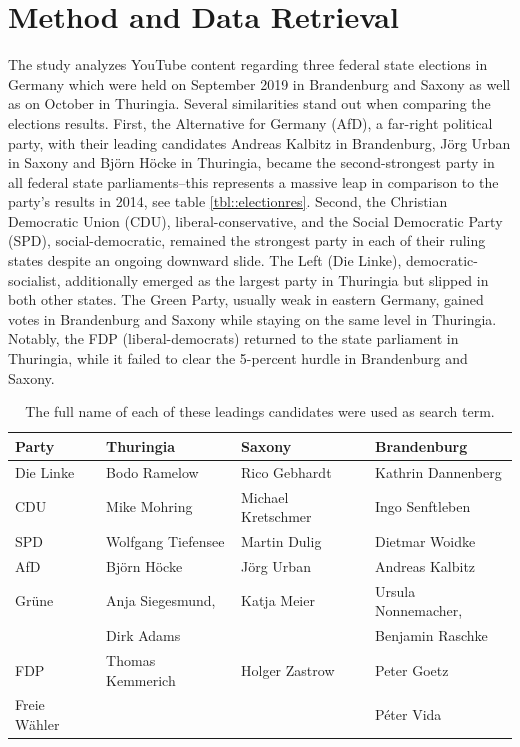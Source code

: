 \documentclass[sigchi, nonacm=true]{acmart}
\begin{document}
\section{Method and Data Retrieval}

  The study analyzes YouTube content regarding three federal state elections in Germany which were held on  September 2019 in Brandenburg and Saxony as well as on October  in Thuringia.
  Several similarities stand out when comparing the elections results. First, the Alternative for Germany (AfD), a far-right political party, with their leading candidates Andreas Kalbitz in Brandenburg, J\"org Urban in Saxony and Bj\"orn H\"ocke in Thuringia, became the second-strongest party in all federal state parliaments–this represents a massive leap in comparison to the party’s results in 2014, see table \ref{tbl::electionres}. Second, the Christian Democratic Union (CDU), liberal-conservative, and the Social Democratic Party (SPD), social-democratic, remained the strongest party in each of their ruling states despite an ongoing downward slide. The Left (Die Linke), democratic-socialist, additionally emerged as the largest party in Thuringia but slipped in both other states. The Green Party, usually weak in eastern Germany, gained votes in Brandenburg and Saxony while staying on the same level in Thuringia. Notably, the FDP (liberal-democrats) returned to the state parliament in Thuringia, while it failed to clear the 5-percent hurdle in Brandenburg and Saxony.
 
  \begin{table}[t!]
    \centering
    \begin{tabular}{llll}
      \toprule
      Party & Thuringia & Saxony & Brandenburg \\ 
      \midrule
      Die Linke & Bodo Ramelow & Rico Gebhardt & Kathrin Dannenberg \\ 
      CDU & Mike Mohring & Michael Kretschmer & Ingo Senftleben \\ 
      SPD & Wolfgang Tiefensee & Martin Dulig & Dietmar Woidke \\ 
      AfD & Bj\"orn H\"ocke & J\"org Urban & Andreas Kalbitz \\ 
      Grüne & Anja Siegesmund, & Katja Meier & Ursula Nonnemacher, \\
      &  Dirk Adams & & Benjamin Raschke \\
      FDP & Thomas Kemmerich & Holger Zastrow & Peter Goetz \\ 
      Freie W\"ahler &  &  & Péter Vida \\ 
      \bottomrule
    \end{tabular}

    \caption{The full name of each of these leadings candidates were used as search term.}
    \label{tbl::searchterms}
  \end{table}
\end{document}

